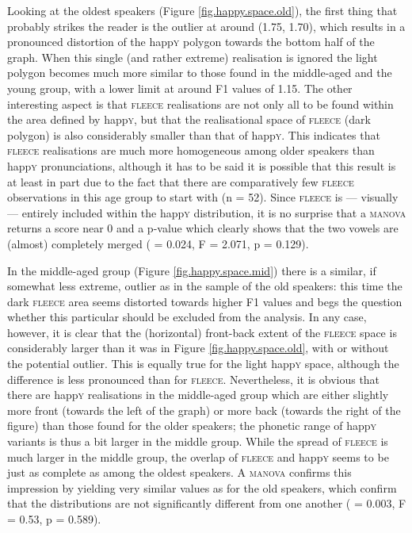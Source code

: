 Looking at the oldest speakers (Figure \ref{fig.happy.space.old}), the first thing that probably strikes the reader is the outlier at around (1.75, 1.70), which results in a pronounced distortion of the happ\textsc{y} polygon towards the bottom half of the graph.
When this single (and rather extreme) realisation is ignored the light polygon becomes much more similar to those found in the middle-aged and the young group, with a lower limit at around F1 values of 1.15.
The other interesting aspect is that \textsc{fleece} realisations are not only all to be found within the area defined by happ\textsc{y}, but that the realisational space of \textsc{fleece} (dark polygon) is also considerably smaller than that of happ\textsc{y}.
This indicates that \textsc{fleece} realisations are much more homogeneous among older speakers than happ\textsc{y} pronunciations, although it has to be said it is possible that this result is at least in part due to the fact that there are comparatively few \textsc{fleece} observations in this age group to start with (n = 52).
Since \textsc{fleece} is --- visually --- entirely included within the happ\textsc{y} distribution, it is no surprise that a \textsc{manova} returns a  score near 0 and a p-value which clearly shows that the two vowels are (almost) completely merged ( = 0.024, F = 2.071, p = 0.129).

In the middle-aged group (Figure \ref{fig.happy.space.mid}) there is a similar, if somewhat less extreme, outlier as in the sample of the old speakers: this time the dark \textsc{fleece} area seems distorted towards higher F1 values and begs the question whether this particular  should be excluded from the analysis.
In any case, however, it is clear that the (horizontal) front-back extent of the \textsc{fleece} space is considerably larger than it was in Figure \ref{fig.happy.space.old}, with or without the potential outlier.
This is equally true for the light happ\textsc{y} space, although the difference is less pronounced than for \textsc{fleece}.
Nevertheless, it is obvious that there are happ\textsc{y} realisations in the middle-aged group which are either slightly more front (towards the left of the graph) or more back (towards the right of the figure) than those found for the older speakers; the phonetic range of happ\textsc{y} variants is thus a bit larger in the middle group.
While the spread of \textsc{fleece} is much larger in the middle group, the overlap of \textsc{fleece} and happ\textsc{y} seems to be just as complete as among the oldest speakers.
A \textsc{manova} confirms this impression by yielding very similar values as for the old speakers, which confirm that the  distributions are not significantly different from one another ( = 0.003, F = 0.53, p = 0.589).


